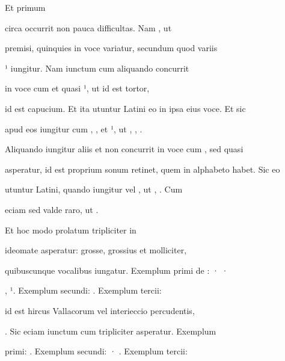 \indentK Et primum

\fulllines

circa  occurrit non pauca difficultas. Nam , ut

premisi, quinquies in voce variatur, secundum quod variis

¹ iungitur. Nam iunctum cum  aliquando concurrit

in voce cum  et quasi ¹, ut  id est tortor, 


id est capucium. Et ita utuntur Latini eo in ipsa eius voce. Et sic

apud eos iungitur cum , , et ¹, ut , , .

Aliquando iungitur aliis et non concurrit in voce cum , sed quasi

asperatur, id est proprium sonum retinet, quem in alphabeto habet. Sic eo

utuntur Latini, quando iungitur  vel , ut , . Cum 

\splitlines
eciam sed valde raro, ut .

\indentK Et hoc modo prolatum tripliciter in 

\fulllines

 ideomate asperatur: grosse, grossius et molliciter,

quibuscunque vocalibus iungatur. Exemplum primi de : · ·

\break
{}
, ¹. Exemplum secundi:   . Exemplum tercii:

  id est hircus Vallacorum vel interieccio percudentis,

 . Sic eciam iunctum cum  tripliciter asperatur. Exemplum

primi:  . Exemplum secundi: · . Exemplum tercii:

